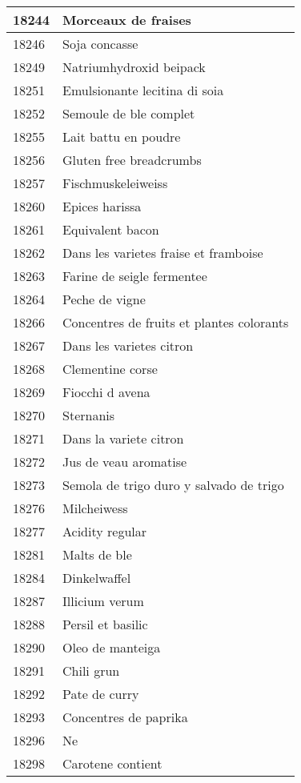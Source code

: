 \begin{longtable}{|l|l|}
18244 & Morceaux de fraises \\ \hline 
18246 & Soja concasse \\ \hline 
18249 & Natriumhydroxid beipack \\ \hline 
18251 & Emulsionante lecitina di soia \\ \hline 
18252 & Semoule de ble complet \\ \hline 
18255 & Lait battu en poudre \\ \hline 
18256 & Gluten free breadcrumbs \\ \hline 
18257 & Fischmuskeleiweiss \\ \hline 
18260 & Epices harissa \\ \hline 
18261 & Equivalent bacon \\ \hline 
18262 & Dans les varietes fraise et framboise \\ \hline 
18263 & Farine de seigle fermentee \\ \hline 
18264 & Peche de vigne \\ \hline 
18266 & Concentres de fruits et plantes colorants \\ \hline 
18267 & Dans les varietes citron \\ \hline 
18268 & Clementine corse \\ \hline 
18269 & Fiocchi d avena \\ \hline 
18270 & Sternanis \\ \hline 
18271 & Dans la variete citron \\ \hline 
18272 & Jus de veau aromatise \\ \hline 
18273 & Semola de trigo duro y salvado de trigo \\ \hline 
18276 & Milcheiwess \\ \hline 
18277 & Acidity regular \\ \hline 
18281 & Malts de ble \\ \hline 
18284 & Dinkelwaffel \\ \hline 
18287 & Illicium verum \\ \hline 
18288 & Persil et basilic \\ \hline 
18290 & Oleo de manteiga \\ \hline 
18291 & Chili grun \\ \hline 
18292 & Pate de curry \\ \hline 
18293 & Concentres de paprika \\ \hline 
18296 & Ne \\ \hline 
18298 & Carotene contient \\ \hline 

\end{longtable}
